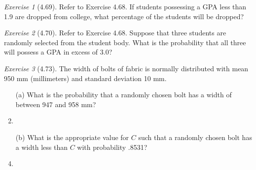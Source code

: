\documentclass[12pt]{amsart}
\makeatletter
\theoremstyle{remark}
\newtheorem*{exercise}{Exercise}%
\renewenvironment{proof}[1][\proofname]{\par\doublespacing
  \pushQED{\qed}%
  \normalfont \topsep6\p@\@plus6\p@\relax
  \list{}{%
    \settowidth{\leftmargin}{\itshape\proofname:\hskip\labelsep}%
    \setlength{\labelwidth}{0pt}%
    \setlength{\itemindent}{-\leftmargin}%
  }%
  \item[\hskip\labelsep\itshape#1\@addpunct{:}]\ignorespaces
}{%
  \popQED\endlist\@endpefalse
  \singlespacing
}
\theoremstyle{mycomment}
\makeatother
\begin{document}
\begin{exercise}[4.69]
Refer to Exercise 4.68. If students possessing a GPA less than 1.9 are dropped from college, what percentage of the students will be dropped?

\begin{proof}[Solution]
 
\end{proof}
\end{exercise}

\begin{exercise}[4.70]
Refer to Exercise 4.68. Suppose that three students are randomly selected from the student body. What is the probability that all three will possess a GPA in excess of 3.0?

\begin{proof}[Solution]
 
\end{proof}
\end{exercise}

\begin{exercise}[4.73]
The width of bolts of fabric is normally distributed with mean 950 mm (millimeters) and standard deviation 10 mm.

\begin{enumerate}
    \item[(a)] What is the probability that a randomly chosen bolt has a width of between 947 and 958 mm?
\begin{proof}[Solution]
 
\end{proof}
    \item[(b)] What is the appropriate value for $C$ such that a randomly chosen bolt has a width less than $C$ with probability .8531?
\begin{proof}[Solution]
 
\end{proof}
\end{enumerate}
\end{exercise}
\end{document}
